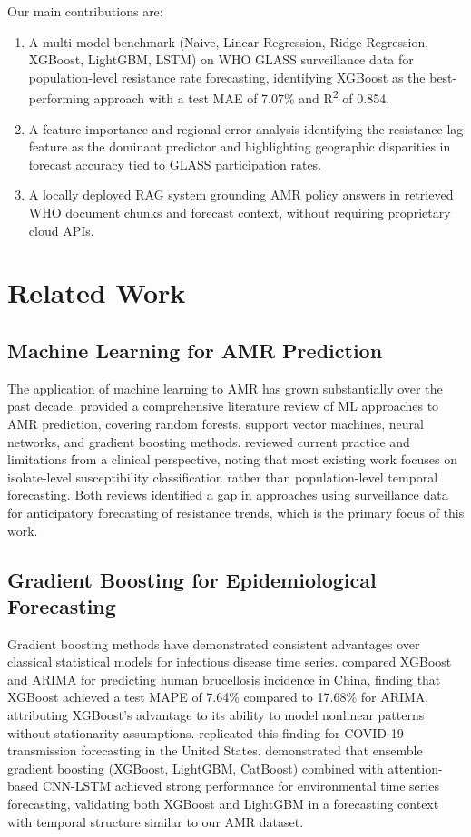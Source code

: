 \documentclass[12pt]{article}
\begin{document}
Our main contributions are:
\begin{enumerate}
    \item A multi-model benchmark (Naive, Linear Regression, Ridge Regression, XGBoost, LightGBM, LSTM) on WHO GLASS surveillance data for population-level resistance rate forecasting, identifying XGBoost as the best-performing approach with a test MAE of 7.07\% and R\textsuperscript{2} of 0.854.
    \item A feature importance and regional error analysis identifying the resistance lag feature as the dominant predictor and highlighting geographic disparities in forecast accuracy tied to GLASS participation rates.
    \item A locally deployed RAG system grounding AMR policy answers in retrieved WHO document chunks and forecast context, without requiring proprietary cloud APIs.
\end{enumerate}

\section{Related Work}

\subsection{Machine Learning for AMR Prediction}

The application of machine learning to AMR has grown substantially over the past decade. \citet{sakagianni2023} provided a comprehensive literature review of ML approaches to AMR prediction, covering random forests, support vector machines, neural networks, and gradient boosting methods. \citet{kim2022} reviewed current practice and limitations from a clinical perspective, noting that most existing work focuses on isolate-level susceptibility classification rather than population-level temporal forecasting. Both reviews identified a gap in approaches using surveillance data for anticipatory forecasting of resistance trends, which is the primary focus of this work.

\subsection{Gradient Boosting for Epidemiological Forecasting}

Gradient boosting methods have demonstrated consistent advantages over classical statistical models for infectious disease time series. \citet{alim2020} compared XGBoost and ARIMA for predicting human brucellosis incidence in China, finding that XGBoost achieved a test MAPE of 7.64\% compared to 17.68\% for ARIMA, attributing XGBoost's advantage to its ability to model nonlinear patterns without stationarity assumptions. \citet{fang2022} replicated this finding for COVID-19 transmission forecasting in the United States. \citet{ahn2023} demonstrated that ensemble gradient boosting (XGBoost, LightGBM, CatBoost) combined with attention-based CNN-LSTM achieved strong performance for environmental time series forecasting, validating both XGBoost \citep{chen2016} and LightGBM \citep{ke2017} in a forecasting context with temporal structure similar to our AMR dataset.
\end{document}

